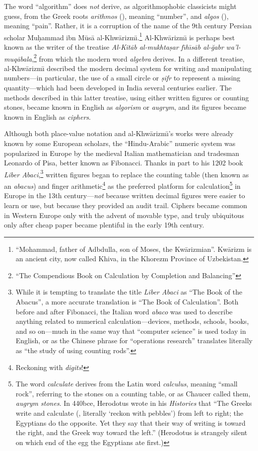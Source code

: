 The word “algorithm” does \textit{not} derive, as algorithmophobic classicists might guess, from the Greek roots \textit{arithmos} (), meaning “number”, and \textit{algos} (), meaning “pain”. Rather, it is a corruption of the name of the 9th century Persian scholar Mu\d{h}ammad ibn M\=us\=a al-Khw\=arizm\=\i.\footnote{“Mohammad, father of Adbdulla, son of Moses, the Kw\=arizmian”. Kw\=arizm is an ancient city, now called Khiva, in the Khorezm Province of Uzbekistan.} Al-Khw\=arizm\=\i{} is perhaps best known as the writer of the treatise \textit{Al-Kit\=ab al-mukhta\d{s}ar f\=\i h\=\i s\=ab al-ğabr} \textit{wa’l-muq\=abala},\footnote{“The Compendious Book on Calculation by Completion and Balancing”} from which the modern word \textit{algebra} derives. In a different treatise, al-Khw\=arizm\=\i{} described the modern decimal system for writing and manipulating numbers—in particular, the use of a small circle or \textit{\d{s}ifr} to represent a missing quantity—which had been developed in India several centuries earlier. The methods described in this latter treatise, using either written figures or counting stones, became known in English as \textit{algorism} or \textit{augrym}, and its figures became known in English as \textit{ciphers}.

Although both place-value notation and al-Khw\=arizm\=\i’s works were already known by some European scholars, the “Hindu-Arabic” numeric system was popularized in Europe by the medieval Italian mathematician and tradesman Leonardo of Pisa, better known as Fibonacci. Thanks in part to his 1202 book \textit{Liber Abaci},\footnote{While it is tempting to translate the title \textit{Liber Abaci} as “The Book of the Abacus”, a more accurate translation is “The Book of Calculation”. Both before and after Fibonacci, the Italian word \textit{abaco} was used to describe anything related to numerical calculation—devices, methods, schools, books, and so on—much in the same way that “computer science” is used today in English, or as the Chinese phrase for “operations research” translates literally as “the study of using counting rods”.} written figures began to replace the counting table (then known as an \textit{abacus}) and finger arithmetic\footnote{Reckoning with \textit{digits}!} as the preferred platform for calculation\footnote{The word \textit{calculate} derives from the Latin word \textit{calculus}, meaning “small rock”, referring to the stones on a counting table, or as Chaucer called them, \textit{augrym stones}. In 440bce, Herodotus wrote in his \textit{Histories} that “The Greeks write and calculate (, literally ‘reckon with pebbles’) from left to right; the Egyptians do the opposite. Yet they say that their way of writing is toward the right, and the Greek way toward the left.” (Herodotus is strangely silent on which end of the egg the Egyptians ate first.)} in Europe in the 13th century—\textit{not} because written decimal figures were easier to learn or use, but because they provided an audit trail. Ciphers became common in Western Europe only with the advent of movable type, and truly ubiquitous only after cheap paper became plentiful in the early 19th century.

